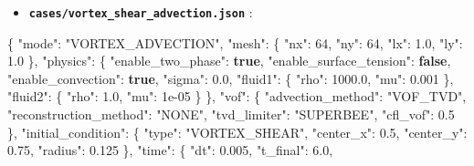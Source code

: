 \documentclass[
  10pt,
]{article}
\newenvironment{Shaded}{}{}
\newcommand{\DataTypeTok}[1]{\textcolor[rgb]{0.56,0.13,0.00}{#1}}
\newcommand{\DecValTok}[1]{\textcolor[rgb]{0.25,0.63,0.44}{#1}}
\newcommand{\FloatTok}[1]{\textcolor[rgb]{0.25,0.63,0.44}{#1}}
\newcommand{\FunctionTok}[1]{\textcolor[rgb]{0.02,0.16,0.49}{#1}}
\newcommand{\KeywordTok}[1]{\textcolor[rgb]{0.00,0.44,0.13}{\textbf{#1}}}
\newcommand{\StringTok}[1]{\textcolor[rgb]{0.25,0.44,0.63}{#1}}
\providecommand{\tightlist}{%
  \setlength{\itemsep}{0pt}\setlength{\parskip}{0pt}}
\begin{document}
\begin{itemize}
\tightlist
\item
  \textbf{\texttt{cases/vortex\_shear\_advection.json}} :
\end{itemize}

\begin{Shaded}
\begin{Highlighting}[]
\FunctionTok{\{}
  \DataTypeTok{"mode"}\FunctionTok{:} \StringTok{"VORTEX\_ADVECTION"}\FunctionTok{,}
  \DataTypeTok{"mesh"}\FunctionTok{:} \FunctionTok{\{}
    \DataTypeTok{"nx"}\FunctionTok{:} \DecValTok{64}\FunctionTok{,}
    \DataTypeTok{"ny"}\FunctionTok{:} \DecValTok{64}\FunctionTok{,}
    \DataTypeTok{"lx"}\FunctionTok{:} \FloatTok{1.0}\FunctionTok{,}
    \DataTypeTok{"ly"}\FunctionTok{:} \FloatTok{1.0}
  \FunctionTok{\},}
  \DataTypeTok{"physics"}\FunctionTok{:} \FunctionTok{\{}
    \DataTypeTok{"enable\_two\_phase"}\FunctionTok{:} \KeywordTok{true}\FunctionTok{,}
    \DataTypeTok{"enable\_surface\_tension"}\FunctionTok{:} \KeywordTok{false}\FunctionTok{,}
    \DataTypeTok{"enable\_convection"}\FunctionTok{:} \KeywordTok{true}\FunctionTok{,}
    \DataTypeTok{"sigma"}\FunctionTok{:} \FloatTok{0.0}\FunctionTok{,}
    \DataTypeTok{"fluid1"}\FunctionTok{:} \FunctionTok{\{}
      \DataTypeTok{"rho"}\FunctionTok{:} \FloatTok{1000.0}\FunctionTok{,}
      \DataTypeTok{"mu"}\FunctionTok{:} \FloatTok{0.001}
    \FunctionTok{\},}
    \DataTypeTok{"fluid2"}\FunctionTok{:} \FunctionTok{\{}
      \DataTypeTok{"rho"}\FunctionTok{:} \FloatTok{1.0}\FunctionTok{,}
      \DataTypeTok{"mu"}\FunctionTok{:} \DecValTok{1e{-}05}
    \FunctionTok{\}}
  \FunctionTok{\},}
  \DataTypeTok{"vof"}\FunctionTok{:} \FunctionTok{\{}
    \DataTypeTok{"advection\_method"}\FunctionTok{:} \StringTok{"VOF\_TVD"}\FunctionTok{,}
    \DataTypeTok{"reconstruction\_method"}\FunctionTok{:} \StringTok{"NONE"}\FunctionTok{,}
    \DataTypeTok{"tvd\_limiter"}\FunctionTok{:} \StringTok{"SUPERBEE"}\FunctionTok{,}
    \DataTypeTok{"cfl\_vof"}\FunctionTok{:} \FloatTok{0.5}
  \FunctionTok{\},}
  \DataTypeTok{"initial\_condition"}\FunctionTok{:} \FunctionTok{\{}
    \DataTypeTok{"type"}\FunctionTok{:} \StringTok{"VORTEX\_SHEAR"}\FunctionTok{,}
    \DataTypeTok{"center\_x"}\FunctionTok{:} \FloatTok{0.5}\FunctionTok{,}
    \DataTypeTok{"center\_y"}\FunctionTok{:} \FloatTok{0.75}\FunctionTok{,}
    \DataTypeTok{"radius"}\FunctionTok{:} \FloatTok{0.125}
  \FunctionTok{\},}
  \DataTypeTok{"time"}\FunctionTok{:} \FunctionTok{\{}
    \DataTypeTok{"dt"}\FunctionTok{:} \FloatTok{0.005}\FunctionTok{,}
    \DataTypeTok{"t\_final"}\FunctionTok{:} \FloatTok{6.0}\FunctionTok{,}

\end{Highlighting}
\end{Shaded}
\end{document}
